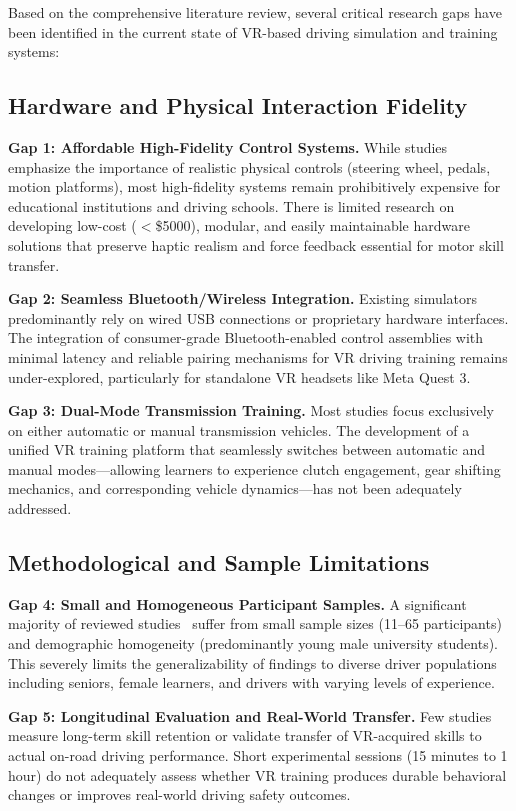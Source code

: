 Based on the comprehensive literature review, several critical research gaps have been identified in the current state of VR-based driving simulation and training systems:

\subsection{Hardware and Physical Interaction Fidelity}
\textbf{Gap 1: Affordable High-Fidelity Control Systems.} While studies~\cite{Harari2021,GilCarvajal2024} emphasize the importance of realistic physical controls (steering wheel, pedals, motion platforms), most high-fidelity systems remain prohibitively expensive for educational institutions and driving schools. There is limited research on developing low-cost ($<$\$5000), modular, and easily maintainable hardware solutions that preserve haptic realism and force feedback essential for motor skill transfer.

\textbf{Gap 2: Seamless Bluetooth/Wireless Integration.} Existing simulators predominantly rely on wired USB connections or proprietary hardware interfaces. The integration of consumer-grade Bluetooth-enabled control assemblies with minimal latency and reliable pairing mechanisms for VR driving training remains under-explored, particularly for standalone VR headsets like Meta Quest 3.

\textbf{Gap 3: Dual-Mode Transmission Training.} Most studies focus exclusively on either automatic or manual transmission vehicles. The development of a unified VR training platform that seamlessly switches between automatic and manual modes—allowing learners to experience clutch engagement, gear shifting mechanics, and corresponding vehicle dynamics—has not been adequately addressed.

\subsection{Methodological and Sample Limitations}
\textbf{Gap 4: Small and Homogeneous Participant Samples.} A significant majority of reviewed studies~\cite{Muguro2023,Qadir2019,Xu2022,Schultheis2005,Chung2022} suffer from small sample sizes (11–65 participants) and demographic homogeneity (predominantly young male university students). This severely limits the generalizability of findings to diverse driver populations including seniors, female learners, and drivers with varying levels of experience.

\textbf{Gap 5: Longitudinal Evaluation and Real-World Transfer.} Few studies~\cite{He2022} measure long-term skill retention or validate transfer of VR-acquired skills to actual on-road driving performance. Short experimental sessions (15 minutes to 1 hour) do not adequately assess whether VR training produces durable behavioral changes or improves real-world driving safety outcomes.

